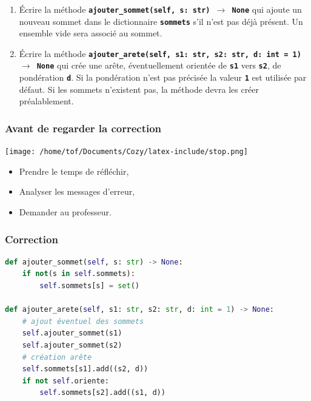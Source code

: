 \documentclass[svgnames,11pt]{beamer}
\begin{document}
\begin{frame}
    \frametitle{}

    \begin{activite}
    \begin{enumerate}
        
    \item Écrire la méthode \textbf{\texttt{ajouter\_sommet(self, s: str) $\rightarrow$ None}} qui ajoute un nouveau sommet dans le dictionnaire \textbf{\texttt{sommets}} s'il n'est pas déjà présent. Un ensemble vide sera associé au sommet.
    \item Écrire la méthode \textbf{\texttt{ajouter\_arete(self, s1: str, s2: str, d: int = 1) $\rightarrow$ None}} qui crée une arête, éventuellement orientée de \textbf{\texttt{s1}} vers \textbf{\texttt{s2}}, de pondération \textbf{\texttt{d}}. Si la pondération n'est pas précisée la valeur \textbf{\texttt{1}} est utilisée par défaut. Si les sommets n'existent pas, la méthode devra les créer préalablement.
    \end{enumerate}
    \end{activite}

\end{frame}
\begin{frame}
    \frametitle{Avant de regarder la correction}
\begin{center}
    \centering
    \texttt{[image: /home/tof/Documents/Cozy/latex-include/stop.png]}
    \end{center}
{\Large
    \begin{itemize}
        \item Prendre le temps de réfléchir,
        \item Analyser les messages d'erreur,
        \item Demander au professeur.
    \end{itemize}
}
\end{frame}
\begin{frame}[fragile]
    \frametitle{Correction}

\begin{center}
\begin{lstlisting}[language=Python , basicstyle=\ttfamily\small, xleftmargin=2em, xrightmargin=2em]
def ajouter_sommet(self, s: str) -> None:
    if not(s in self.sommets):
        self.sommets[s] = set()

def ajouter_arete(self, s1: str, s2: str, d: int = 1) -> None:
    # ajout éventuel des sommets
    self.ajouter_sommet(s1)
    self.ajouter_sommet(s2)
    # création arête
    self.sommets[s1].add((s2, d))
    if not self.oriente:
        self.sommets[s2].add((s1, d))
\end{lstlisting}
\end{center}

\end{frame}
\end{document}
